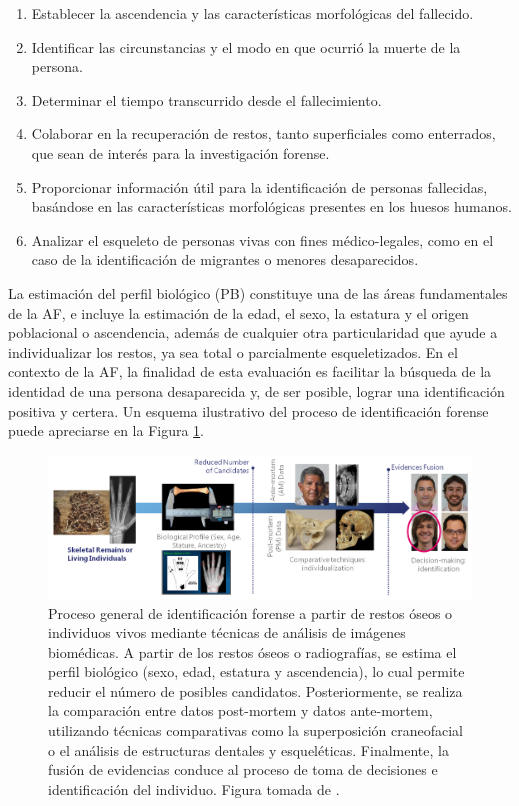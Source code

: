 \begin{enumerate}
    \item Establecer la ascendencia y las características morfológicas del fallecido.
    \item Identificar las circunstancias y el modo en que ocurrió la muerte de la persona.
    \item Determinar el tiempo transcurrido desde el fallecimiento.
    \item Colaborar en la recuperación de restos, tanto superficiales como enterrados, que sean de interés para la investigación forense.
    \item Proporcionar información útil para la identificación de personas fallecidas, basándose en las características morfológicas presentes en los huesos humanos.
    \item Analizar el esqueleto de personas vivas con fines médico-legales, como en el caso de la identificación de migrantes o menores desaparecidos.
\end{enumerate}

La estimación del perfil biológico (PB) constituye una de las áreas fundamentales de la AF, e incluye la estimación de la edad, el sexo, la estatura y el origen poblacional o ascendencia, además de cualquier otra particularidad que ayude a individualizar los restos, ya sea total o parcialmente esqueletizados. En el contexto de la AF, la finalidad de esta evaluación es facilitar la búsqueda de la identidad de una persona desaparecida y, de ser posible, lograr una identificación positiva y certera. Un esquema ilustrativo del proceso de identificación forense puede apreciarse en la Figura \ref{fig:intro_1}.

\begin{figure}[h]
    \centering
    \includegraphics[width=1\linewidth]{figures/1_introduction/intro_1.png}
    \caption[Proceso general de identificación forense a partir de restos óseos o individuos vivos]{Proceso general de identificación forense a partir de restos óseos o individuos vivos mediante técnicas de análisis de imágenes biomédicas. A partir de los restos óseos o radiografías, se estima el perfil biológico (sexo, edad, estatura y ascendencia), lo cual permite reducir el número de posibles candidatos. Posteriormente, se realiza la comparación entre datos post-mortem y datos ante-mortem, utilizando técnicas comparativas como la superposición craneofacial o el análisis de estructuras dentales y esqueléticas. Finalmente, la fusión de evidencias conduce al proceso de toma de decisiones e identificación del individuo. Figura tomada de \cite{RefWorks:RefID:21-mesejo2020survey}.}
    \label{fig:intro_1}
\end{figure}

